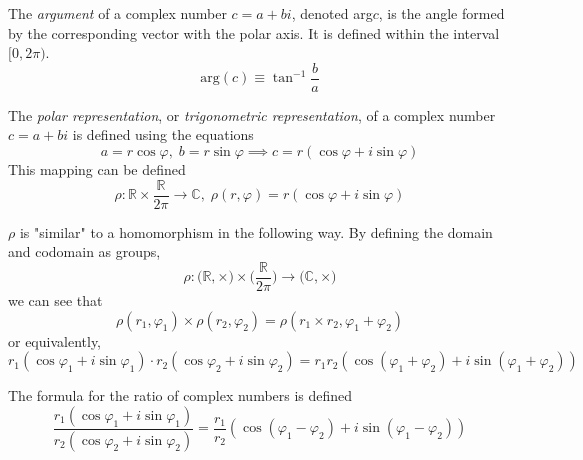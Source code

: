 \documentclass{article}
\begin{document}
      \begin{definition}
        The \textit{argument} of a complex number $c = a + b i$, denoted arg$c$, is the angle formed by the corresponding vector with the polar axis. It is defined within the interval $[0, 2\pi)$. 
        \begin{equation}
          \text{arg}(c) \equiv \tan^{-1}{\frac{b}{a}}
        \end{equation}
      \end{definition}

      \begin{definition}
        The \textit{polar representation}, or \textit{trigonometric representation}, of a complex number $c = a + b i$ is defined using the equations 
        \begin{equation}
          a = r \cos{\varphi}, \; b = r\sin{\varphi} \implies c = r (\cos{\varphi} + i \sin{\varphi})
        \end{equation}
        This mapping can be defined 
        \begin{equation}
          \rho: \mathbb{R} \times \frac{\mathbb{R}}{2 \pi} \longrightarrow \mathbb{C}, \; \rho(r, \varphi) = r (\cos{\varphi} + i \sin{\varphi})
        \end{equation}
      \end{definition}

      \begin{theorem}
        $\rho$ is "similar" to a homomorphism in the following way. By defining the domain and codomain as groups, 
        \begin{equation}
          \rho: \big( \mathbb{R}, \times \big) \times \Big( \frac{\mathbb{R}}{2 \pi} \Big) \longrightarrow \big( \mathbb{C}, \times \big)
        \end{equation}
        we can see that
        \begin{equation}
          \rho (r_1, \varphi_1) \times \rho(r_2, \varphi_2) = \rho(r_1 \times r_2, \varphi_1 + \varphi_2) 
        \end{equation}
        or equivalently, 
        \begin{equation}
          r_1 (\cos{\varphi_1} + i \sin{\varphi_1}) \cdot r_2 (\cos{\varphi_2} + i \sin{\varphi_2}) = r_1 r_2 (\cos{(\varphi_1 + \varphi_2)} + i \sin{(\varphi_1 + \varphi_2)})
        \end{equation}
      \end{theorem}

      \begin{corollary}
        The formula for the ratio of complex numbers is defined
        \begin{equation}
          \frac{r_1 (\cos{\varphi_1} + i \sin{\varphi_1})}{r_2 (\cos{\varphi_2} + i \sin{\varphi_2})} = \frac{r_1}{r_2} (\cos{(\varphi_1 - \varphi_2)} + i \sin{(\varphi_1 - \varphi_2)})
        \end{equation}
      \end{corollary}
\end{document}
